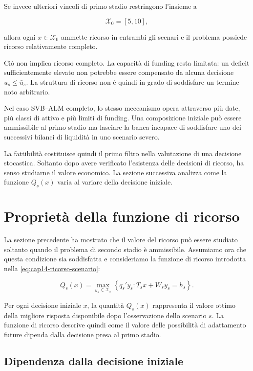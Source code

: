 Se invece ulteriori vincoli di primo stadio restringono l'insieme a

\[
\mathcal X_0=[5,10],
\]

\noindent allora ogni $x\in\mathcal X_0$ ammette ricorso in entrambi gli scenari e il
problema possiede ricorso relativamente completo.

Ci\`o non implica ricorso completo. La capacit\`a di funding resta limitata:
un deficit sufficientemente elevato non potrebbe essere compensato da alcuna
decisione $u_s\leq\bar u_s$. La struttura di ricorso non \`e quindi in grado
di soddisfare un termine noto arbitrario.

Nel caso SVB--ALM completo, lo stesso meccanismo opera attraverso pi\`u date,
pi\`u classi di attivo e pi\`u limiti di funding. Una composizione iniziale
pu\`o essere ammissibile al primo stadio ma lasciare la banca incapace di
soddisfare uno dei successivi bilanci di liquidit\`a in uno scenario severo.

La fattibilit\`a costituisce quindi il primo filtro nella valutazione di una
decisione stocastica. Soltanto dopo avere verificato l'esistenza delle
decisioni di ricorso, ha senso studiarne il valore economico. La sezione
successiva analizza come la funzione $Q_s(x)$ varia al variare della decisione
iniziale.

\section{Propriet\`a della funzione di ricorso}

\label{sec:cap15-proprieta-funzione-ricorso-v2}

La sezione precedente ha mostrato che il valore del ricorso pu\`o essere
studiato soltanto quando il problema di secondo stadio \`e ammissibile.
Assumiamo ora che questa condizione sia soddisfatta e consideriamo la funzione
di ricorso introdotta nella
\eqref{eq:cap14-ricorso-scenario}:

\[
Q_s(x)
=
\max_{y_s\in\mathcal X_s}
\left\{
q_s'y_s:
T_sx+W_sy_s=h_s
\right\}.
\]

Per ogni decisione iniziale $x$, la quantit\`a $Q_s(x)$ rappresenta il valore
ottimo della migliore risposta disponibile dopo l'osservazione dello
scenario $s$. La funzione di ricorso descrive quindi come il valore delle
possibilit\`a di adattamento future dipenda dalla decisione presa al primo
stadio.

\subsection{Dipendenza dalla decisione iniziale}

